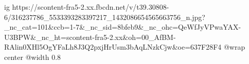  
 
 
 
 

\ifcmt
  ig https://scontent-fra5-2.xx.fbcdn.net/v/t39.30808-6/316237786_5533393283397217_1432086654565663756_n.jpg?_nc_cat=101&ccb=1-7&_nc_sid=8bfeb9&_nc_ohc=QeWfJyVPwaYAX-U3BPW&_nc_ht=scontent-fra5-2.xx&oh=00_AfBM-RAlin0XHl5OgYFaLh8J3Q2pxjHrUsm3bAqLNzkCjw&oe=637F28F4
  @wrap center
  @width 0.8
\fi
